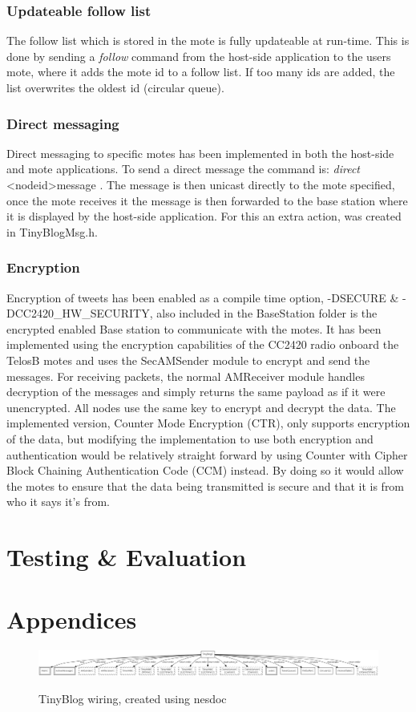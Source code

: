\documentclass{article}
\begin{document}
\subsubsection{Updateable follow list}
The follow list which is stored in the mote is fully updateable at run-time. This is done by sending a \textit{follow} command from the host-side application to the users mote, where it adds the mote id to a follow list. If too many ids are added, the list overwrites the oldest id (circular queue).
\subsubsection{Direct messaging}
Direct messaging to specific motes has been implemented in both the host-side and mote applications. To send a direct message the command is: \textit{direct} \textless nodeid\textgreater message .
The message is then unicast directly to the mote specified, once the mote receives it the message is then forwarded to the base station where it is displayed by the host-side application. For this an extra action, was created in TinyBlogMsg.h.
\subsubsection{Encryption}
Encryption of tweets has been enabled as a compile time option, -DSECURE \& -DCC2420\_HW\_SECURITY, also included in the BaseStation folder is the encrypted enabled Base station to communicate with the motes. It has been implemented using the encryption capabilities of the CC2420 radio onboard the TelosB motes and uses the SecAMSender module to encrypt and send the messages. For receiving packets, the normal AMReceiver module handles decryption of the messages and simply returns the same payload as if it were unencrypted. All nodes use the same key to encrypt and decrypt the data.
The implemented version, Counter Mode Encryption (CTR), only supports encryption of the data, but modifying the implementation to use both encryption and authentication would be relatively straight forward by using Counter with Cipher Block Chaining Authentication Code (CCM) instead. By doing so it would allow the motes to ensure that the data being transmitted is secure and that it is from who it says it's from. 


\section{Testing \& Evaluation}


\section{Appendices}
\begin{figure}[htb!]
\centering
\includegraphics[scale=.27,angle=90]{TinyBlogAppC.png}
\label{fig:fullWiring}
\caption{TinyBlog wiring, created using nesdoc}
\end{figure}
\end{document}
